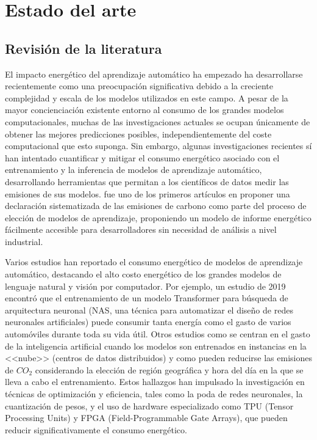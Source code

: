 \chapter{Estado del arte}
\label{chap:sota}

\section{Revisión de la literatura}
\label{sec:lit-rev}



El impacto energético del aprendizaje automático ha empezado ha desarrollarse recientemente como una preocupación significativa debido a la creciente complejidad y escala de los modelos utilizados en este campo. A pesar de la mayor concienciación existente entorno al consumo de los grandes modelos computacionales, muchas de las investigaciones actuales se ocupan únicamente de obtener las mejores predicciones posibles, independientemente del coste computacional que esto suponga. Sin embargo, algunas investigaciones recientes sí han intentado cuantificar y mitigar el consumo energético asociado con el entrenamiento y la inferencia de modelos de aprendizaje automático, desarrollando herramientas que permitan a los científicos de datos medir las emisiones de sus modelos. \cite{lottick2019} fue uno de los primeros artículos en proponer una declaración sistematizada de las emisiones de carbono como parte del proceso de elección de modelos de aprendizaje, proponiendo un modelo de informe energético fácilmente accesible para desarrolladores sin necesidad de análisis a nivel industrial.

Varios estudios han reportado el consumo energético de modelos de aprendizaje automático, destacando el alto costo energético de los grandes modelos de lenguaje natural y visión por computador. Por ejemplo, un estudio de 2019 \cite{strubell2019nlp} encontró que el entrenamiento de un modelo Transformer para búsqueda de arquitectura neuronal (NAS, una técnica para automatizar el diseño de redes neuronales artificiales) puede consumir tanta energía como el gasto de varios automóviles durante toda su vida útil. Otros estudios como \cite{dodge2022cloud} se centran en el gasto de la inteligencia artificial cuando los modelos son entrenados en instancias en la <<nube>> (centros de datos distribuidos) y como pueden reducirse las emisiones de $CO_2$ considerando la elección de región geográfica y hora del día en la que se lleva a cabo el entrenamiento. Estos hallazgos han impulsado la investigación en técnicas de optimización y eficiencia, tales como la poda de redes neuronales, la cuantización de pesos, y el uso de hardware especializado como TPU (Tensor Processing Units) y FPGA (Field-Programmable Gate Arrays), que pueden reducir significativamente el consumo energético.

